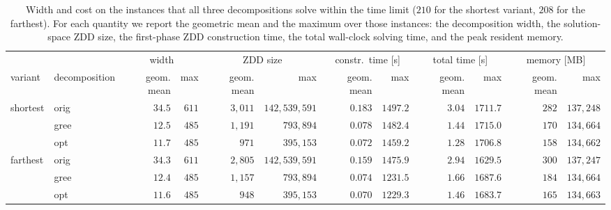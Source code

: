 \documentclass[conference]{IEEEtran}
\newcommand{\OrigDecom}{\textsf{orig}\xspace}
\newcommand{\HeurDecom}{\textsf{gree}\xspace}
\newcommand{\OptDecom}{\textsf{opt}\xspace}
\begin{document}
\begin{table}[t]
  \centering
  \caption{Width and cost on the instances that all three decompositions solve
  within the time limit ($210$ for the shortest variant, $208$ for the farthest).
  For each quantity we report the geometric mean and the maximum over those
  instances: the decomposition width, the solution-space ZDD size, the first-phase ZDD construction time, the total wall-clock solving
  time, and the peak resident memory.}
  \label{tab:zddsize}
  \setlength{\tabcolsep}{4pt}
  \begin{tabular}{ll|rr|rr|rr|rr|rr}
    \hline
    & & \multicolumn{2}{c|}{width} & \multicolumn{2}{c|}{ZDD size}
      & \multicolumn{2}{c|}{constr.\ time [s]} & \multicolumn{2}{c|}{total time [s]}
      & \multicolumn{2}{c}{memory [MB]} \\
    variant & decomposition & geom. mean & max & geom. mean & max & geom. mean & max
      & geom. mean & max & geom. mean & max \\
    \hline
    \multirow{3}{*}{shortest}
      & \OrigDecom & $34.5$ & $611$ & $3{,}011$ & $142{,}539{,}591$ & $0.183$ & $1497.2$ & $3.04$ & $1711.7$ & $282$ & $137{,}248$ \\
      & \HeurDecom & $12.5$ & $485$ & $1{,}191$ & $793{,}894$ & $0.078$ & $1482.4$ & $1.44$ & $1715.0$ & $170$ & $134{,}664$ \\
      & \OptDecom  & $11.7$ & $485$ & $971$ & $395{,}153$ & $0.072$ & $1459.2$ & $1.28$ & $1706.8$ & $158$ & $134{,}662$ \\
    \hline
    \multirow{3}{*}{farthest}
      & \OrigDecom & $34.3$ & $611$ & $2{,}805$ & $142{,}539{,}591$ & $0.159$ & $1475.9$ & $2.94$ & $1629.5$ & $300$ & $137{,}247$ \\
      & \HeurDecom & $12.4$ & $485$ & $1{,}157$ & $793{,}894$ & $0.074$ & $1231.5$ & $1.66$ & $1687.6$ & $184$ & $134{,}664$ \\
      & \OptDecom  & $11.6$ & $485$ & $948$ & $395{,}153$ & $0.070$ & $1229.3$ & $1.46$ & $1683.7$ & $165$ & $134{,}663$ \\
    \hline
  \end{tabular}
\end{table}


\end{document}
